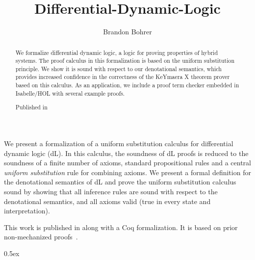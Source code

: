 \documentclass[11pt,a4paper]{article}
\begin{document}
\title{Differential-Dynamic-Logic}
\author{Brandon Bohrer}
\maketitle

\begin{abstract}
 We formalize differential dynamic logic, a logic for proving
 properties of hybrid systems. The proof calculus in this
 formalization is based on the uniform substitution principle. We show
 it is sound with respect to our denotational semantics, which
 provides increased confidence in the correctness of the KeYmaera X
 theorem prover based on this calculus. As an application, we include
 a proof term checker embedded in Isabelle/HOL with several example
 proofs.

Published in \cite{BohrerCPP17}
\end{abstract}

  We present a formalization of a uniform substitution calculus for
  differential dynamic logic (dL). In this calculus, the soundness of dL
  proofs is reduced to the soundness of a finite number of axioms, standard
  propositional rules and a central \textit{uniform substitution} rule for
  combining axioms. We present a formal definition for the denotational
  semantics of dL and prove the uniform substitution calculus sound by showing
  that all inference rules are sound with respect to the denotational
  semantics, and all axioms valid (true in every state and interpretation).

  This work is published in \cite{BohrerCPP17} along with a Coq formalization.
  It is based on prior non-mechanized proofs~\cite{DBLP:journals/jar/Platzer16,DBLP:conf/cade/Platzer15}.

\tableofcontents

\parindent 0pt\parskip 0.5ex





\end{document}
